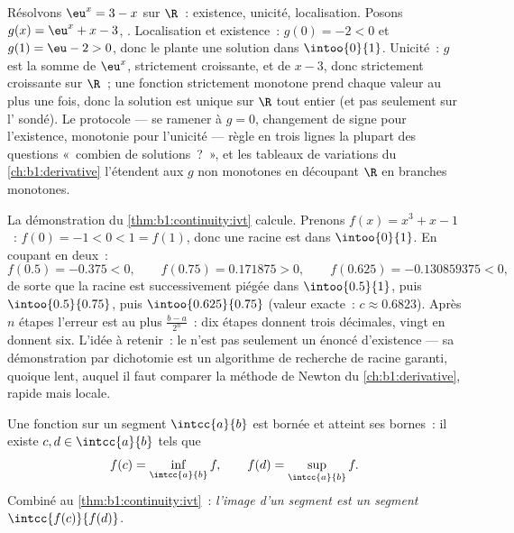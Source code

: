 \begin{example}\label{ex:b1:continuity:protocol}
Résolvons $\eu^x = 3 - x$ sur $\R$~: existence, unicité,
localisation. Posons $g(x) = \eu^x + x - 3$, .
Localisation et existence~: $g(0) = -2 < 0$ et $g(1) = \eu - 2 >
0$, donc le  plante une
solution dans $\intoo{0}{1}$. Unicité~: $g$ est la somme de
$\eu^x$, strictement croissante, et de $x - 3$, donc strictement
croissante sur $\R$~; une fonction strictement monotone prend
chaque valeur au plus une fois, donc la solution est unique sur
$\R$ tout entier (et pas seulement sur l' sondé). Le
protocole --- se ramener à $g = 0$, changement de signe pour
l'existence, monotonie pour l'unicité --- règle en trois lignes
la plupart des questions «~combien de solutions~?~», et les
tableaux de variations du \cref{ch:b1:derivative} l'étendent aux
$g$ non monotones en découpant $\R$ en branches monotones.
\end{example}

\begin{example}\label{ex:b1:continuity:dichotomy}
La démonstration du \cref{thm:b1:continuity:ivt} calcule. Prenons
$f(x) = x^3 + x - 1$~: $f(0) = -1 < 0 < 1 = f(1)$, donc une
racine est dans $\intoo{0}{1}$. En coupant en deux~:
\[
f(0.5) = -0.375 < 0, \qquad
f(0.75) = 0.171875 > 0, \qquad
f(0.625) = -0.130859375 < 0 ,
\]
de sorte que la racine est successivement piégée dans
$\intoo{0.5}{1}$, puis $\intoo{0.5}{0.75}$, puis
$\intoo{0.625}{0.75}$ (valeur exacte~: $c \approx 0.6823$). Après
$n$ étapes l'erreur est au plus $\frac{b - a}{2^n}$~: dix étapes
donnent trois décimales, vingt en donnent six. L'idée à retenir~:
le  n'est pas seulement un
énoncé d'existence --- sa démonstration par dichotomie est un
algorithme de recherche de racine garanti, quoique lent, auquel
il faut comparer la méthode de Newton du
\cref{ch:b1:derivative}, rapide mais locale.
\end{example}

\begin{theorem}\label{thm:b1:continuity:evt}
Une fonction  sur un segment $\intcc{a}{b}$ est bornée et
atteint ses bornes~: il existe $c, d \in \intcc{a}{b}$ tels que
\[
f(c) = \inf_{\intcc{a}{b}} f,
\qquad
f(d) = \sup_{\intcc{a}{b}} f .
\]
Combiné au \cref{thm:b1:continuity:ivt}~: \emph{l'image  d'un
segment est un segment} $\intcc{f(c)}{f(d)}$.
\end{theorem}

